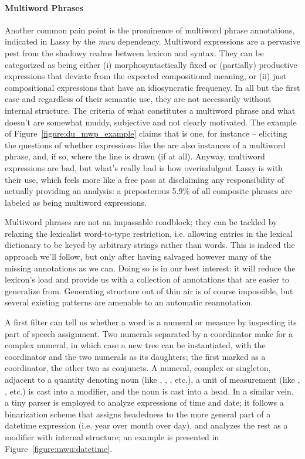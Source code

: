\paragraph{Multiword Phrases}
Another common pain point is the prominence of multiword phrase annotations, indicated in Lassy by the \textit{mwu} dependency.
Multiword expressions are a pervasive pest from the shadowy realms between lexicon and syntax.
They can be categorized as being either (i) morphosyntactically fixed or (partially) productive expressions that deviate from the expected compositional meaning, or (ii) just compositional expressions that have an idiosyncratic frequency.
In all but the first case and regardless of their semantic use, they are not necessarily without internal structure.
The criteria of what constitutes a multiword phrase and what doesn't are somewhat muddy, subjective and not clearly motivated.
The example of Figure~\ref{figure:du_mwp_example} claims that  is one, for instance -- eliciting the questions of whether expressions like the  are also instances of a multiword phrase, and, if so, where the line is drawn (if at all).
Anyway, multiword expressions are bad, but what's really bad is how overindulgent Lassy is with their use, which feels more like a free pass at disclaiming any responsibility of actually providing an analysis: a preposterous 5.9\% of all composite phrases are labeled as being multiword expressions.

Multiword phrases are not an impassable roadblock; they can be tackled by relaxing the lexicalist word-to-type restriction, i.e. allowing entries in the lexical dictionary to be keyed by arbitrary strings rather than words.
This is indeed the approach we'll follow, but only after having salvaged however many of the missing annotations as we can.
Doing so is in our best interest: it will reduce the lexicon's load and provide us with a collection of annotations that are easier to generalize from.
Generating structure out of thin air is of course impossible, but several existing patterns are amenable to an automatic reannotation.

A first filter can tell us whether a word is a numeral or measure by inspecting its part of speech assignment.
Two numerals separated by a coordinator make for a complex numeral, in which case a new tree can be instantiated, with the coordinator and the two numerals as its daughters; the first marked as a coordinator, the other two as conjuncts.
A numeral, complex or singleton, adjacent to a quantity denoting noun (like , , , etc.), a unit of measurement (like , , etc.) is cast into a modifier, and the noun is cast into a head.
In a similar vein, a tiny parser is employed to analyze expressions of time and date; it follows a binarization scheme that assigns headedness to the more general part of a datetime expression (i.e. year over month over day), and analyzes the rest as a modifier with internal structure; an example is presented in Figure~\ref{figure:mwu:datetime}.

